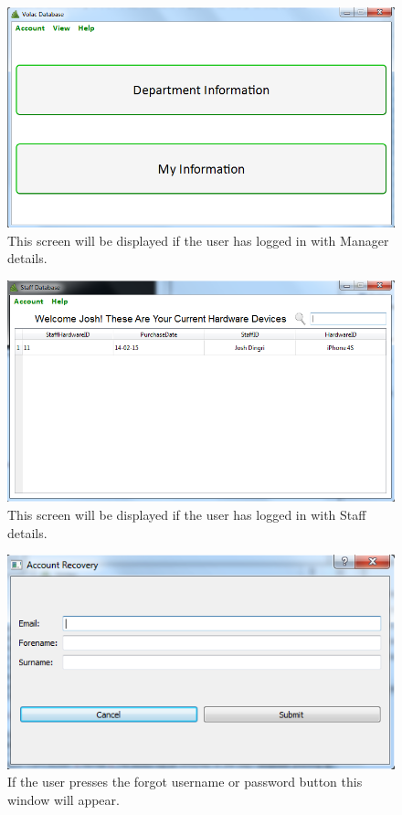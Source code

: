 \begin{figure}[H]
    \includegraphics[width=\textwidth]{./Testing/Images/ManagerLogin.png}
    \caption{This screen will be displayed if the user has logged in with Manager details.} \label{fig:ManagerInterfaceLogin}
\end{figure}

\begin{figure}[H]
    \includegraphics[width=\textwidth]{./Testing/Images/StaffLogin.png}
    \caption{This screen will be displayed if the user has logged in with Staff details.} \label{fig:StaffInterfaceLogin}
\end{figure}

\begin{figure}[H]
    \includegraphics[width=\textwidth]{./Testing/Images/ForgotPassword.png}
    \caption{If the user presses the forgot username or password button this window will appear.} \label{fig:ForgotPassword}
\end{figure}

